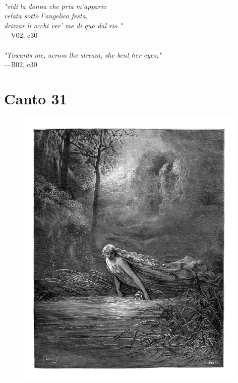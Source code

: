 \documentclass[../Dore_vision.tex]{subfiles}
\begin{document}
\begin{center}
\begin{minipage}{0.8\linewidth}
\textit{\\
"vidi la donna che pria m’appario\\velata sotto l’angelica festa,\\drizzar li occhi ver’ me di qua dal rio."} \\
—V02, c30 \\~\\
\textit{"Towards me, across the stream, she bent her eyes;"} \\
—B02, c30
\end{minipage}
\end{center}

\newpage

\section{Canto 31}

\begin{figure}[ht]
\centering
\includegraphics[height=\figsize]{illustrations/book_2/V02, c31.jpg}
\end{figure}
\end{document}
